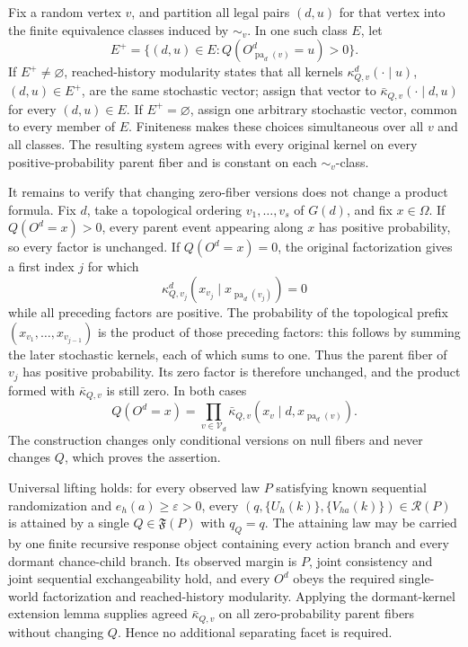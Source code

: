 Fix a random vertex \(v\), and partition all legal pairs \((d,u)\) for that vertex into the finite equivalence classes induced by \(\sim_v\).  In one such class \(E\), let
\[
 E^+=\{(d,u)\in E:Q(O^d_{\operatorname{pa}_d(v)}=u)>0\}.
\]
If \(E^+\neq\varnothing\), reached-history modularity states that all kernels \(\kappa^d_{Q,v}(\cdot\mid u)\), \((d,u)\in E^+\), are the same stochastic vector; assign that vector to \(\bar\kappa_{Q,v}(\cdot\mid d,u)\) for every \((d,u)\in E\).  If \(E^+=\varnothing\), assign one arbitrary stochastic vector, common to every member of \(E\).  Finiteness makes these choices simultaneous over all \(v\) and all classes.  The resulting system agrees with every original kernel on every positive-probability parent fiber and is constant on each \(\sim_v\)-class.

It remains to verify that changing zero-fiber versions does not change a product formula.  Fix \(d\), take a topological ordering \(v_1,\ldots,v_s\) of \(G(d)\), and fix \(x\in\Omega\).  If \(Q(O^d=x)>0\), every parent event appearing along \(x\) has positive probability, so every factor is unchanged.  If \(Q(O^d=x)=0\), the original factorization gives a first index \(j\) for which
\[
 \kappa^d_{Q,v_j}(x_{v_j}\mid x_{\operatorname{pa}_d(v_j)})=0
\]
while all preceding factors are positive.  The probability of the topological prefix \((x_{v_1},\ldots,x_{v_{j-1}})\) is the product of those preceding factors: this follows by summing the later stochastic kernels, each of which sums to one.  Thus the parent fiber of \(v_j\) has positive probability.  Its zero factor is therefore unchanged, and the product formed with \(\bar\kappa_{Q,v}\) is still zero.  In both cases
\[
 Q(O^d=x)=\prod_{v\in\mathcal V_d}
 \bar\kappa_{Q,v}(x_v\mid d,x_{\operatorname{pa}_d(v)}).
\]
The construction changes only conditional versions on null fibers and never changes \(Q\), which proves the assertion.

Universal lifting holds: for every observed law \(P\) satisfying known sequential randomization and \(e_h(a)\geq\varepsilon>0\), every \((q,\{U_h(k)\},\{V_{ha}(k)\})\in\mathcal R(P)\) is attained by a single \(Q\in\mathfrak F(P)\) with \(q_Q=q\).  The attaining law may be carried by one finite recursive response object containing every action branch and every dormant chance-child branch.  Its observed margin is \(P\), joint consistency and joint sequential exchangeability hold, and every \(O^d\) obeys the required single-world factorization and reached-history modularity.  Applying the dormant-kernel extension lemma supplies agreed \(\bar\kappa_{Q,v}\) on all zero-probability parent fibers without changing \(Q\).  Hence no additional separating facet is required.

